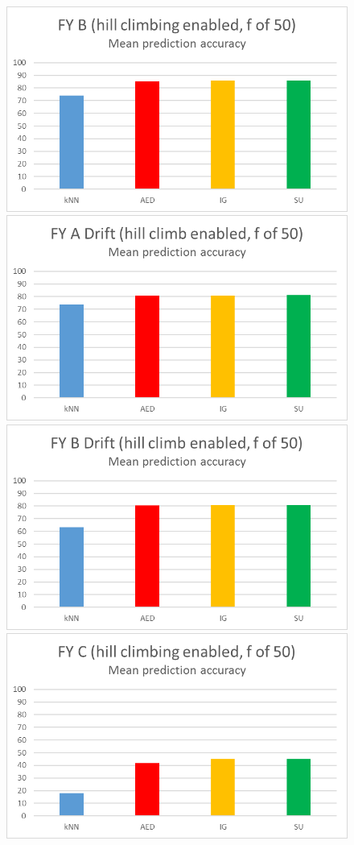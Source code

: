 \begin{figure}[hp]
\includegraphics[scale=0.17]{Graphs/FY_B/H_bar}
\includegraphics[scale=0.17]{Graphs/FY_A_Drift/H_bar}
\includegraphics[scale=0.17]{Graphs/FY_B_Drift/H_bar}
\includegraphics[scale=0.17]{Graphs/FY_C/H_bar}

\end{figure}
